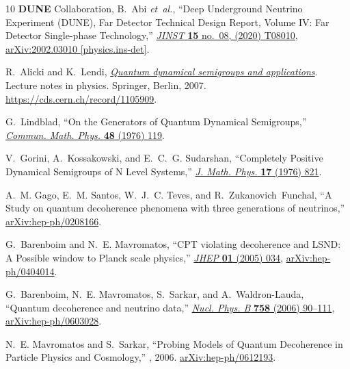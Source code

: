 \documentclass[aps, prd, onecolumn, tightenlines, notitlepage, superscriptaddress, nofootinbib, preprintnumbers, floatfix,showkeys,11pt]{revtex4-2}
\begin{document}
\begin{thebibliography}{10}
{\bfseries DUNE} Collaboration, B.~Abi {\em et~al.}, ``{Deep Underground
  Neutrino Experiment (DUNE), Far Detector Technical Design Report, Volume IV:
  Far Detector Single-phase Technology},''
  \href{http://dx.doi.org/10.1088/1748-0221/15/08/T08010}{{\em JINST}
  {\bfseries 15} no.~08, (2020) T08010},
  \href{http://arxiv.org/abs/2002.03010}{{\ttfamily arXiv:2002.03010
  [physics.ins-det]}}.

R.~Alicki and K.~Lendi, \href{http://dx.doi.org/10.1007/3-540-70861-8}{{\em
  {Quantum dynamical semigroups and applications}}}.
\newblock Lecture notes in physics. Springer, Berlin, 2007.
\newblock \url{https://cds.cern.ch/record/1105909}.

G.~Lindblad, ``{On the Generators of Quantum Dynamical Semigroups},''
  \href{http://dx.doi.org/10.1007/BF01608499}{{\em Commun. Math. Phys.}
  {\bfseries 48} (1976) 119}.

V.~Gorini, A.~Kossakowski, and E.~C.~G. Sudarshan, ``{Completely Positive
  Dynamical Semigroups of N Level Systems},''
  \href{http://dx.doi.org/10.1063/1.522979}{{\em J. Math. Phys.} {\bfseries 17}
  (1976) 821}.

A.~M. Gago, E.~M. Santos, W.~J.~C. Teves, and R.~Zukanovich~Funchal, ``{A Study
  on quantum decoherence phenomena with three generations of neutrinos},''
  \href{http://arxiv.org/abs/hep-ph/0208166}{{\ttfamily arXiv:hep-ph/0208166}}.

G.~Barenboim and N.~E. Mavromatos, ``{CPT violating decoherence and LSND: A
  Possible window to Planck scale physics},''
  \href{http://dx.doi.org/10.1088/1126-6708/2005/01/034}{{\em JHEP} {\bfseries
  01} (2005) 034}, \href{http://arxiv.org/abs/hep-ph/0404014}{{\ttfamily
  arXiv:hep-ph/0404014}}.

G.~Barenboim, N.~E. Mavromatos, S.~Sarkar, and A.~Waldron-Lauda, ``{Quantum
  decoherence and neutrino data},''
  \href{http://dx.doi.org/10.1016/j.nuclphysb.2006.09.012}{{\em Nucl. Phys. B}
  {\bfseries 758} (2006) 90--111},
  \href{http://arxiv.org/abs/hep-ph/0603028}{{\ttfamily arXiv:hep-ph/0603028}}.

N.~E. Mavromatos and S.~Sarkar, ``{Probing Models of Quantum Decoherence in
  Particle Physics and Cosmology},''
, 2006.
\newblock \href{http://arxiv.org/abs/hep-ph/0612193}{{\ttfamily
  arXiv:hep-ph/0612193}}.


\end{thebibliography}
\end{document}
